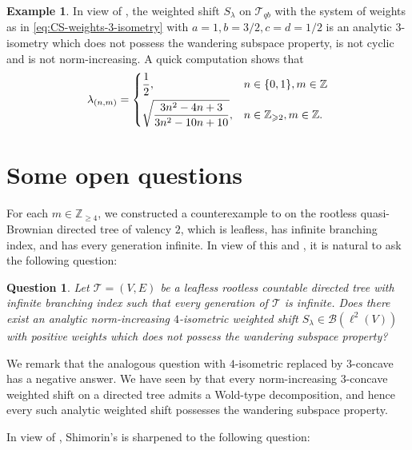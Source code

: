 \documentclass[11pt, reqno, a4paper]{amsart}
\newtheorem{question}[theorem]{Question}
\theoremstyle{definition}
\newtheorem{example}[theorem]{Example}
\newcommand{\calB}{{\mathcal{B}}}
\newcommand{\scrT}{{\mathscr T}}
\renewcommand{\ge}{\geqslant}
\newcommand{\Z}{\mathbb Z}
\numberwithin{equation}{section}
\begin{document}
    \begin{example}
        In view of , the weighted shift $S_{\lambda}$ on $\scrT_{qb}$ with the system of weights as in \eqref{eq:CS-weights-3-isometry} with $a=1, b= 3/2, c=d=1/2$ is an analytic $3$-isometry which does not possess the wandering subspace property, is not cyclic and is not norm-increasing. A quick computation shows that 
        \begin{equation*}
            \lambda_{(n,m)} = \begin{dcases}
                \frac{1}{2}, & n \in \{ 0,1 \}, m \in \Z \\
                \sqrt{\frac{3n^2 - 4n + 3}{3n^2 - 10n + 10}}, & n \in \Z_{\ge 2}, m \in \Z.
            \end{dcases}
        \end{equation*}
        \label{ex:analytic-non-cyclic-no-WSP}
    \end{example}


\section{Some open questions}\label{sec:last}
    
    For each $m\in\Z_{\ge 4}$, we constructed a counterexample to  on the rootless quasi-Brownian directed tree of valency $2$, which is leafless, has infinite branching index, and has every generation infinite. In view of this and , it is natural to ask the following question:
    
    \begin{question}
        Let $\scrT=(V,E)$ be a leafless rootless countable directed tree with infinite branching index such that every generation of $\scrT$ is infinite. Does there exist an analytic norm-increasing $4$-isometric weighted shift $S_\lambda\in\calB(\ell^2(V))$ with positive weights which does not possess the wandering subspace property?
    \end{question}
    
    We remark that the analogous question with $4$-isometric replaced by $3$-concave has a negative answer. We have seen by  that every norm-increasing $3$-concave weighted shift on a directed tree admits a Wold-type decomposition, and hence every such analytic weighted shift possesses the wandering subspace property.

    In view of , Shimorin's  is sharpened to the following question:
    
\end{document}
